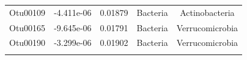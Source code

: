 \documentclass[]{article}
\begin{document}
\begin{longtable}[]{@{}ccccc@{}}
\begin{minipage}[t]{0.13\columnwidth}\centering\strut
Otu00109\strut
\end{minipage} & \begin{minipage}[t]{0.16\columnwidth}\centering\strut
-4.411e-06\strut
\end{minipage} & \begin{minipage}[t]{0.14\columnwidth}\centering\strut
0.01879\strut
\end{minipage} & \begin{minipage}[t]{0.13\columnwidth}\centering\strut
Bacteria\strut
\end{minipage} & \begin{minipage}[t]{0.27\columnwidth}\centering\strut
Actinobacteria\strut
\end{minipage}\tabularnewline
\begin{minipage}[t]{0.13\columnwidth}\centering\strut
Otu00165\strut
\end{minipage} & \begin{minipage}[t]{0.16\columnwidth}\centering\strut
-9.645e-06\strut
\end{minipage} & \begin{minipage}[t]{0.14\columnwidth}\centering\strut
0.01791\strut
\end{minipage} & \begin{minipage}[t]{0.13\columnwidth}\centering\strut
Bacteria\strut
\end{minipage} & \begin{minipage}[t]{0.27\columnwidth}\centering\strut
Verrucomicrobia\strut
\end{minipage}\tabularnewline
\begin{minipage}[t]{0.13\columnwidth}\centering\strut
Otu00190\strut
\end{minipage} & \begin{minipage}[t]{0.16\columnwidth}\centering\strut
-3.299e-06\strut
\end{minipage} & \begin{minipage}[t]{0.14\columnwidth}\centering\strut
0.01902\strut
\end{minipage} & \begin{minipage}[t]{0.13\columnwidth}\centering\strut
Bacteria\strut
\end{minipage} & \begin{minipage}[t]{0.27\columnwidth}\centering\strut
Verrucomicrobia\strut
\end{minipage}\tabularnewline
\begin{minipage}[t]{0.13\columnwidth}\centering\strut

\end{minipage}
\end{longtable}
\end{document}
